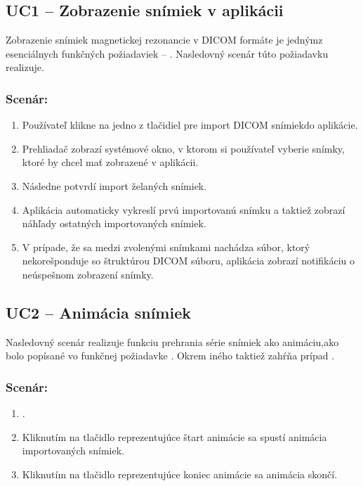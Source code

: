 \subsection {UC1 -- Zobrazenie snímiek v aplikácii}\label{uc1}
Zobrazenie snímiek magnetickej rezonancie v DICOM formáte je jedným\newline z esenciálnych funkčných požiadaviek -- . Nasledovný scenár túto požiadavku realizuje.

\subsubsection*{Scenár:}
\begin {enumerate}
\item {Používateľ klikne na jedno z tlačidiel pre import DICOM snímiek\newline do aplikácie.}
\item {Prehliadač zobrazí systémové okno, v ktorom si používateľ vyberie snímky, ktoré by chcel mať zobrazené v aplikácii.}
\item {Následne potvrdí import želaných snímiek.}
\item {Aplikácia automaticky vykreslí prvú importovanú snímku a taktiež zobrazí náhľady ostatných importovaných snímiek.}
\item {V prípade, že sa medzi zvolenými snímkami nachádza súbor, ktorý nekorešponduje so štruktúrou DICOM súboru, aplikácia zobrazí notifikáciu o neúspešnom zobrazení snímky.}
\end {enumerate}
	
\subsection {UC2 -- Animácia snímiek}\label{uc2}
Nasledovný scenár realizuje funkciu prehrania série snímiek ako animáciu,\newline ako bolo popísané vo funkčnej požiadavke .
Okrem iného taktiež zahŕňa prípad . 

\subsubsection*{Scenár:}
\begin {enumerate}
\item {.}
\item {Kliknutím na tlačidlo reprezentujúce štart animácie sa spustí animácia importovaných snímiek.}
\item {Kliknutím na tlačidlo reprezentujúce koniec animácie sa animácia skončí.}
\end {enumerate}

